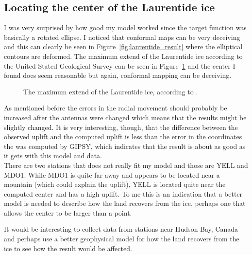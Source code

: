 \documentclass[12pt,a4paper]{article}
\begin{document}
\subsection{Locating the center of the Laurentide ice}
I was very surprised by how good my model worked since the target function was basically a rotated ellipse.
I noticed that conformal maps can be very deceiving and this can clearly be seen in Figure~\ref{fig:laurentide_result} where the elliptical contours are deformed.
The maximum extend of the Laurentide ice according to the United Stated Geological Survey can be seen in Figure~\ref{fig:laurentide_wiki} and the center I found does seem reasonable but again, conformal mapping can be deceiving.
\begin{figure}[!ht]
  \centering
  \noindent{}
  \caption{The maximum extend of the Laurentide ice, according to \cite{laurentide_wiki}.}
  \label{fig:laurentide_wiki}
\end{figure}
As mentioned before the errors in the radial movement should probably be increased after the antennas were changed which means that the results might be slightly changed.
It is very interesting, though, that the difference between the observed uplift and the computed uplift is less than the error in the coordinates the was computed by GIPSY, which indicates that the result is about as good as it gets with this model and data.\\
There are two stations that does not really fit my model and those are YELL and MDO1.
While MDO1 is quite far away and appears to be located near a mountain (which could explain the uplift), YELL is located quite near the computed center and has a high uplift.
To me this is an indication that a better model is needed to describe how the land recovers from the ice, perhaps one that allows the center to be larger than a point.

It would be interesting to collect data from stations near Hudson Bay, Canada and perhaps use a better geophysical model for how the land recovers from the ice to see how the result would be affected.
\end{document}
